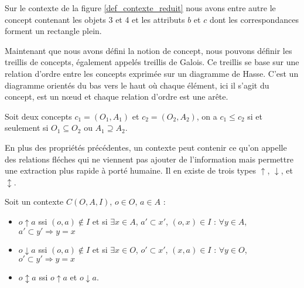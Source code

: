 Sur le contexte de la figure \ref{def_contexte_reduit} nous avons entre autre le concept contenant les objets 3 et 4 et les attributs $b$ et $c$ dont les correspondances forment un rectangle plein.

\bigbreak

Maintenant que nous avons défini la notion de concept, nous pouvons définir les treillis de concepts, également appelés treillis de Galois. Ce treillis se base sur une relation d'ordre entre les concepts exprimée sur un diagramme de Hasse. C'est un diagramme orientés du bas vers le  haut où chaque élément, ici il s'agit du concept, est un n\oe ud et chaque relation d'ordre est une arête.

\begin{definition}
Soit deux concepts $c_1 = (O_1, A_1)$ et $c_2 = (O_2, A_2)$, on a $c_1 \leq c_2$ si et seulement si $O_1 \subseteq O_2$ ou $A_1 \supseteq A_2$.
\end{definition}

En plus des propriétés précédentes, un contexte peut contenir ce qu'on appelle des relations fléches qui ne viennent pas ajouter de l'information mais permettre une extraction plus rapide à porté humaine. Il en existe de trois types $\uparrow$, $\downarrow$, et $\updownarrow$.

\begin{definition}
Soit un contexte $C(O, A, I)$, $o \in O$, $a \in A$ :
\begin{itemize}
	\item $o \uparrow a$ ssi $(o, a) \not \in I$ et si $\exists x \in A$, $a' \subset x'$, $(o, x) \in I$ : $\forall y \in A$, $a' \subset y' \Rightarrow y = x$ 
	\item $o \downarrow a$ ssi $(o, a) \not \in I$ et si $\exists x \in O$, $o' \subset x'$, $(x, a) \in I$ : $\forall y \in O$, $o' \subset y' \Rightarrow y = x$ 
	\item $o \updownarrow a$ ssi $o \uparrow a$ et $o	 \downarrow a$.
\end{itemize}
\end{definition}

